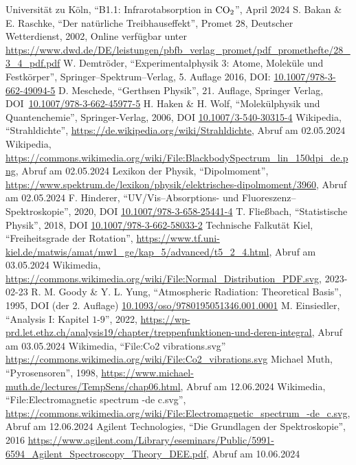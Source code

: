 \documentclass[12pt,a4paper]{scrartcl}
\numberwithin{equation}{section} %
\begin{document}
\begin{thebibliography}{9}
	Universität zu Köln, ``B1.1: Infrarotabsorption in $\ce{CO_2}$'', April 2024
	S. Bakan \& E. Raschke, ``Der natürliche Treibhauseffekt'', Promet 28,
	Deutscher Wetterdienst, 2002, Online verfügbar unter
	\url{https://www.dwd.de/DE/leistungen/pbfb_verlag_promet/pdf_promethefte/28_3_4_pdf.pdf}
	W. Demtröder, ``Experimentalphysik 3: Atome, Moleküle und Festkörper'',
	Springer--Spektrum--Verlag, 5. Auflage 2016, DOI:
	\href{https://doi.org/10.1007/978-3-662-49094-5}{10.1007/978-3-662-49094-5}
	D. Meschede, ``Gerthsen Physik'', 21. Auflage, Springer Verlag,
	DOI~\href{https://doi.org/10.1007/978-3-662-45977-5}{10.1007/978-3-662-45977-5}
	H. Haken \& H. Wolf, ``Molekülphysik und Quantenchemie'', Springer-Verlag, 2006, DOI \href{https://doi.org/10.1007/3-540-30315-4}{10.1007/3-540-30315-4}
	Wikipedia, ``Strahldichte'',
	\url{https://de.wikipedia.org/wiki/Strahldichte}, Abruf am 02.05.2024
	Wikipedia, \url{https://commons.wikimedia.org/wiki/File:BlackbodySpectrum_lin_150dpi_de.png},
	Abruf am 02.05.2024
	Lexikon der Physik, ``Dipolmoment'',
	\url{https://www.spektrum.de/lexikon/physik/elektrisches-dipolmoment/3960},
	Abruf am 02.05.2024
	F. Hinderer, ``UV/Vis--Absorptions- und Fluoreszenz--Spektroskopie'',
	2020, DOI \href{https://doi.org/10.1007/978-3-658-25441-4}{10.1007/978-3-658-25441-4}
	T. Fließbach, ``Statistische Physik'', 2018, DOI
	\href{https://doi.org/10.1007/978-3-662-58033-2}{10.1007/978-3-662-58033-2}
	Technische Falkutät Kiel, ``Freiheitsgrade der Rotation'',
	\url{https://www.tf.uni-kiel.de/matwis/amat/mw1_ge/kap_5/advanced/t5_2_4.html},
	Abruf am 03.05.2024
	Wikimedia,
	\url{https://commons.wikimedia.org/wiki/File:Normal_Distribution_PDF.svg},
	2023-02-23
	R. M. Goody \& Y. L. Yung, ``Atmospheric Radiation: Theoretical Basis'', 1995,
	DOI  (der 2. Auflage) \href{https://doi.org/10.1093/oso/9780195051346.001.0001}{10.1093/oso/9780195051346.001.0001}
	M. Einsiedler, ``Analysis I: Kapitel $1$-$9$'', 2022,
	\url{https://wp-prd.let.ethz.ch/analysis19/chapter/treppenfunktionen-und-deren-integral},
	Abruf am 03.05.2024
	Wikimedia, ``File:Co2 vibrations.svg''
	\url{https://commons.wikimedia.org/wiki/File:Co2_vibrations.svg}
	Michael Muth, ``Pyrosensoren'', 1998,
	\url{https://www.michael-muth.de/lectures/TempSens/chap06.html}, Abruf am 12.06.2024
	Wikimedia, ``File:Electromagnetic spectrum -de c.svg'',
	\url{https://commons.wikimedia.org/wiki/File:Electromagnetic_spectrum_-de_c.svg}, Abruf am 12.06.2024
	Agilent Technologies, ``Die Grundlagen der Spektroskopie'', 2016
	\url{https://www.agilent.com/Library/eseminars/Public/5991-6594_Agilent_Spectroscopy_Theory_DEE.pdf},
	Abruf am 10.06.2024
\end{thebibliography}
\end{document}
